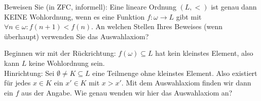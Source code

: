 
\begin{exercise}[286]

Beweisen Sie (in ZFC, informell): Eine lineare Ordnung $(L,<)$ ist genau dann
KEINE Wohlordnung, wenn es eine Funktion $f: \omega \to L$ gibt mit
$\forall n \in \omega: f(n+1) < f(n)$. An welchen Stellen Ihres Beweises
(wenn überhaupt) verwenden Sie das Auswahlaxiom?

\end{exercise}


\begin{solution}

Beginnen wir mit der Rückrichtung: $f(\omega) \subseteq L$ hat kein kleinstes
Element, also kann $L$ keine Wohlordnung sein. \\
Hinrichtung: Sei $\emptyset \neq K \subseteq L$ eine Teilmenge ohne kleinstes Element.
Also existiert für jedes $x \in K$ ein $x' \in K$ mit $x > x'$.
Mit dem Auswahlaxiom finden wir dann ein $f$ aus der Angabe. Wie genau wenden
wir hier das Auswahlaxiom an?

\end{solution}

